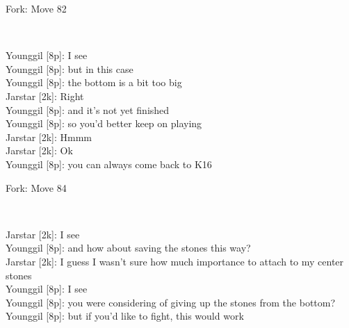 \documentclass{article}
\begin{document}
\begin{subsection}{Fork: Move 82}
\begin{center}
\cleargoban
{}
\showfullgoban
\\\parbox{4.5in}{
Younggil [8p]: I see\\Younggil [8p]: but in this case\\Younggil [8p]: the bottom is a bit too big\\Jarstar [2k]: Right\\Younggil [8p]: and it's not yet finished\\Younggil [8p]: so you'd better keep on playing\\Jarstar [2k]: Hmmm\\Jarstar [2k]: Ok\\Younggil [8p]: you can always come back to K16\\}
\end{center}
\end{subsection}
\begin{subsection}{Fork: Move 84}
\begin{center}
\cleargoban
{}
\showfullgoban
\\\parbox{4.5in}{
Jarstar [2k]: I see\\Younggil [8p]: and how about saving the stones this way?\\Jarstar [2k]: I guess I wasn't sure how much importance to attach to my center stones\\Younggil [8p]: I see\\Younggil [8p]: you were considering of giving up the stones from the bottom?\\Younggil [8p]: but if you'd like to fight, this would work\\}
\end{center}
\end{subsection}
\newpage
\end{document}
